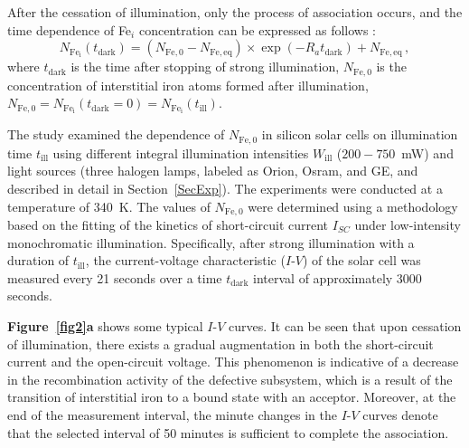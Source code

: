 \documentclass{WileyMSP-template}
\begin{document}
After the cessation of illumination, only the process of association occurs,
and the time dependence of Fe$_i$ concentration can be expressed as follows \cite{FeB:kinetic,MurphyJAP2011}:
\begin{equation}
\label{eqNFet}
N_\mathrm{Fe_i}(t_\mathrm{dark})=(N_\mathrm{Fe,0}-N_\mathrm{Fe,eq})\times
\exp(-R_a t_\mathrm{dark})+N_\mathrm{Fe,eq}\,,
\end{equation}
where $t_\mathrm{dark}$ is the time after stopping of strong illumination,
$N_\mathrm{Fe,0}$ is the concentration of interstitial iron atoms formed after illumination,
$N_\mathrm{Fe,0}=N_\mathrm{Fe_i}(t_\mathrm{dark}=0)=N_\mathrm{Fe_i}(t_\mathrm{ill})$.

The study examined the dependence of $N_\mathrm{Fe,0}$ in silicon solar cells on illumination time $t_\mathrm{ill}$
using different integral illumination intensities $W_\mathrm{ill}$ ($200-750$~mW) and light sources
(three halogen lamps, labeled as Orion, Osram, and GE, and described in detail in Section~\ref{SecExp}).
The experiments were conducted at a temperature of 340~K.
The values of $N_\mathrm{Fe,0}$ were  determined using a methodology \cite{Olikh2022:JMatSci,Olikh2021JAP}
based on the fitting of the kinetics of short-circuit current $I_{SC}$ under low-intensity monochromatic illumination.
Specifically, after strong illumination with a duration of $t_\mathrm{ill}$,
the current-voltage characteristic ($I$-$V$) of the solar cell was measured every 21 seconds over a time $t_\mathrm{dark}$ interval of approximately 3000 seconds.

\textbf{Figure~\ref{fig2}a} shows some typical $I$-$V$ curves.
It can be seen that upon cessation of illumination, there exists a gradual augmentation in both the short-circuit current and the open-circuit voltage.
This phenomenon is indicative of a decrease in the recombination activity of the defective subsystem,
which is a result of the transition of interstitial iron to a bound state with an acceptor.
Moreover, at the end of the measurement interval, the minute changes in the $I$-$V$ curves denote that the selected interval of 50 minutes is sufficient to complete the association.
\end{document}
